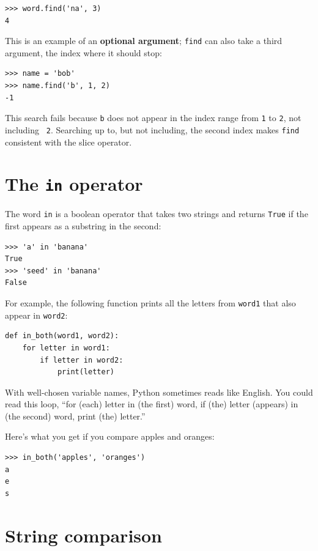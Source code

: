 \documentclass[10pt]{book}
\begin{document}
\begin{verbatim}
>>> word.find('na', 3)
4
\end{verbatim}
%
This is an example of an {\bf optional argument};
{\tt find} can
also take a third argument, the index where it should stop:

\begin{verbatim}
>>> name = 'bob'
>>> name.find('b', 1, 2)
-1
\end{verbatim}
%
This search fails because {\tt b} does not
appear in the index range from {\tt 1} to {\tt 2}, not including {\tt
2}.  Searching up to, but not including, the second index makes
{\tt find} consistent with the slice operator.



\section{The {\tt in} operator}
\label{inboth}

The word {\tt in} is a boolean operator that takes two strings and
returns {\tt True} if the first appears as a substring in the second:

\begin{verbatim}
>>> 'a' in 'banana'
True
>>> 'seed' in 'banana'
False
\end{verbatim}
%
For example, the following function prints all the
letters from {\tt word1} that also appear in {\tt word2}:

\begin{verbatim}
def in_both(word1, word2):
    for letter in word1:
        if letter in word2:
            print(letter)
\end{verbatim}
%
With well-chosen variable names,
Python sometimes reads like English.  You could read
this loop, ``for (each) letter in (the first) word, if (the) letter 
(appears) in (the second) word, print (the) letter.''

Here's what you get if you compare apples and oranges:

\begin{verbatim}
>>> in_both('apples', 'oranges')
a
e
s
\end{verbatim}
%

\section{String comparison}
\end{document}
